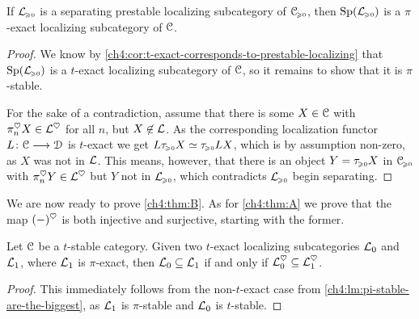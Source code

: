 \begin{lemma}
    \label{ch4:lm:separating-then-pi-exact}
    If $\mathcal{L}_{\hspace{-1pt}\scriptscriptstyle\geqslant 0}$ is a separating prestable localizing subcategory of $\EuScript{C}_{\hspace{-1pt}\scriptscriptstyle\geqslant 0}$, then $\mathrm{Sp}(\mathcal{L}_{\hspace{-1pt}\scriptscriptstyle\geqslant 0})$ is a $\pi$-exact localizing subcategory of $\EuScript{C}$. 
\end{lemma}
\begin{proof}
    We know by \cref{ch4:cor:t-exact-corresponds-to-prestable-localizing} that $\mathrm{Sp}(\mathcal{L}_{\hspace{-1pt}\scriptscriptstyle\geqslant 0})$ is a $t$-exact localizing subcategory of $\EuScript{C}$, so it remains to show that it is $\pi$-stable. 

    For the sake of a contradiction, assume that there is some $X\in \EuScript{C}$ with $\pi_n^\heartsuit X\in \mathcal{L}^\heartsuit$ for all $n$, but $X\not\in \mathcal{L}$. As the corresponding localization functor $L\colon\EuScript{C}\longrightarrow \EuScript{D}$ is $t$-exact we get $L\tau_{\hspace{-1pt}\scriptscriptstyle\geqslant 0} X \simeq \tau_{\hspace{-1pt}\scriptscriptstyle\geqslant 0} LX$, which is by assumption non-zero, as $X$ was not in $\mathcal{L}$. This means, however, that there is an object $Y=\tau_{\hspace{-1pt}\scriptscriptstyle\geqslant 0} X$ in $\EuScript{C}_{\hspace{-1pt}\scriptscriptstyle\geqslant 0}$ with $\pi_n^\heartsuit Y \in \mathcal{L}^\heartsuit$ but $Y$ not in $\mathcal{L}_{\hspace{-1pt}\scriptscriptstyle\geqslant 0}$, which contradicts $\mathcal{L}_{\hspace{-1pt}\scriptscriptstyle\geqslant 0}$ begin separating.  
\end{proof}









We are now ready to prove \cref{ch4:thm:B}. As for \cref{ch4:thm:A} we prove that the map $(-)^\heartsuit$ is both injective and surjective, starting with the former. 

\begin{lemma}
    \label{ch4:lm:pi-exact-are-the-biggest}
    Let $\EuScript{C}$ be a $t$-stable category. Given two $t$-exact localizing subcategories $\mathcal{L}_0$ and $\mathcal{L}_1$, where $\mathcal{L}_1$ is $\pi$-exact, then $\mathcal{L}_0 \subseteq \mathcal{L}_1$ if and only if $\mathcal{L}_0^\heartsuit \subseteq \mathcal{L}_1^\heartsuit$. 
\end{lemma}
\begin{proof}
    This immediately follows from the non-$t$-exact case from \cref{ch4:lm:pi-stable-are-the-biggest}, as $\mathcal{L}_1$ is $\pi$-stable and $\mathcal{L}_0$ is $t$-stable. 
\end{proof}

